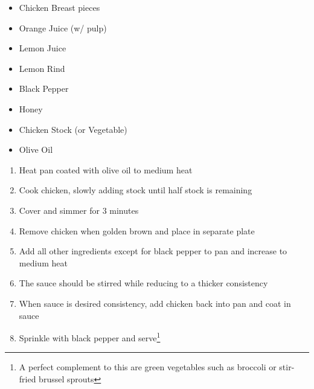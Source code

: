 \documentclass[oneside]{recipe}
\newcommand{\recipecolumn}[2]{
	\begin{multicols}{2}
	\raggedcolumns
	#1
	\columnbreak
	#2
	\end{multicols}
}
\begin{document}
\recipecolumn{
	\begin{itemize}
		\item Chicken Breast pieces
		\item Orange Juice (w/ pulp)
		\item Lemon Juice
		\item Lemon Rind
		\item Black Pepper
		\item Honey
		\item Chicken Stock (or Vegetable)
		\item Olive Oil
	\end{itemize}
}{	
	\begin{enumerate}
		\item Heat pan coated with olive oil to medium heat
		\item Cook chicken, slowly adding stock until half stock is remaining
		\item Cover and simmer for 3 minutes
		\item Remove chicken when golden brown and place in separate plate
		\item Add all other ingredients except for black pepper to pan and increase to medium heat
		\item The sauce should be stirred while reducing to a thicker consistency
		\item When sauce is desired consistency, add chicken back into pan and coat in sauce
		\item Sprinkle with black pepper and serve\footnote{A perfect complement to this are green vegetables such as broccoli or stir-fried brussel sprouts}
	\end{enumerate}
}

\newpage
\end{document}
